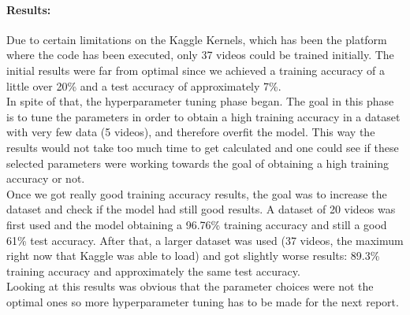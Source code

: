 \documentclass{article}
\begin{document}
\paragraph{\textbf{Results:}}
\noindent Due to certain limitations on the Kaggle Kernels, which has been the platform where the code has been executed, only 37 videos could be trained initially. The initial results were far from optimal since we achieved a training accuracy of a little over 20\% and a test accuracy of approximately 7\%.\\
\noindent In spite of that, the hyperparameter tuning phase began. The goal in this phase is to tune the parameters in order to obtain a high training accuracy in a dataset with very few data (5 videos), and therefore overfit the model. This way the results would not take too much time to get calculated and one could see if these selected parameters were working towards the goal of obtaining a high training accuracy or not.\\
\noindent Once we got really good training accuracy results, the goal was to increase the dataset and check if the model had still good results. A dataset of 20 videos was first used and the model obtaining a 96.76\% training accuracy and still a good 61\% test accuracy. 
\noindent After that, a larger dataset was used (37 videos, the maximum right now that Kaggle was able to load) and got slightly worse results: 89.3\% training accuracy and approximately the same test accuracy. \\
\noindent Looking at this results was obvious that the parameter choices were not the optimal ones so more hyperparameter tuning has to be made for the next report.
\end{document}
